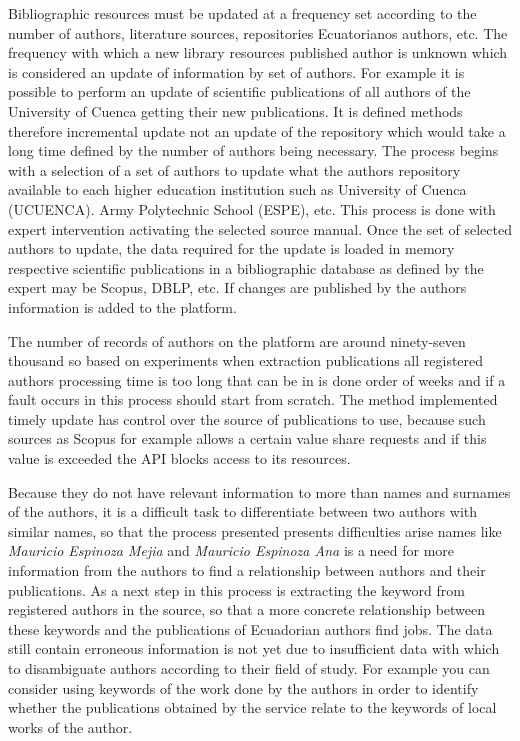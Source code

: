 \documentclass[11pt]{article}
\begin{document}
Bibliographic  resources must be updated at a frequency set according to the number of authors, literature sources, repositories Ecuatorianos authors, etc. The frequency with which a new library resources published author is unknown which is considered an update of information by set of authors. For example it is possible to perform an update of scientific publications of all authors of the University of Cuenca getting their new publications. It is defined methods therefore incremental update not an update of the repository which would take a long time defined by the number of authors being necessary.
The process begins with a selection of a set of authors to update what the authors repository available to each higher education institution such as University of Cuenca (UCUENCA). Army Polytechnic School (ESPE), etc. This process is done with expert intervention activating the selected source manual. Once the set of selected authors to update, the data required for the update is loaded in memory respective scientific publications in a bibliographic database as defined by the expert may be Scopus, DBLP, etc. If changes are published by the authors information is added to the platform.
  
The number of records of authors on the platform are around ninety-seven thousand so based on experiments when extraction publications all registered authors processing time is too long that can be in is done order of weeks and if a fault occurs in this process should start from scratch. The method implemented timely update has control over the source of publications to use, because such sources as Scopus for example allows a certain value share requests and if this value is exceeded the API blocks access to its resources.

 
Because they do not have relevant information to more than names and surnames of the authors, it is a difficult task to differentiate between two authors with similar names, so that the process presented presents difficulties arise names like \textit{Mauricio Espinoza Mejia} and \textit{Mauricio Espinoza Ana} is a need for more information from the authors to find a relationship between authors and their publications. As a next step in this process is extracting the keyword from registered authors in the source, so that a more concrete relationship between these keywords and the publications of Ecuadorian authors find jobs.
The data still contain erroneous information is not yet due to insufficient data with which to disambiguate authors according to their field of study. For example you can consider using keywords of the work done by the authors in order to identify whether the publications obtained by the service relate to the keywords of local works of the author.
\end{document}
